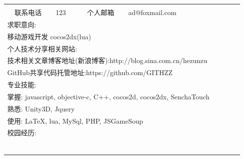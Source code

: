 \documentclass[11pt] {article}
\begin{document}
\begin{table}[!htbp]
\begin{tabular}{|c|l|c|l|c|l|c|l|c|}
		&&&&\\
		\cline{1-4}
		\multirow{2}{*}{联系电话} & \multirow{2}{*}{123} &\multirow{2}{*}{个人邮箱}&\multirow{2}{*}{ad@foxmail.com} &\\
		&&&&\\
		\hline
		\multicolumn{5}{|l|}{\multirow{2}{*}{求职意向:}}\\\multicolumn{5}{|c|}{}\\	
		\hline
		\multicolumn{5}{|l|}{\multirow{2}{*}{移动游戏开发 cocos2dx(lua)}}\\\multicolumn{5}{|c|}{}\\	
		\hline
		\multicolumn{5}{|l|}{\multirow{2}{*}{个人技术分享相关网站:}}\\\multicolumn{5}{|c|}{}\\	
		\hline
		\multicolumn{5}{|l|}{\multirow{2}{*}{技术相关文章博客地址(新浪博客):http://blog.sina.com.cn/hezunzu}}\\\multicolumn{5}{|c|}{}\\	
		\multicolumn{5}{|l|}{\multirow{2}{*}{GitHub共享代码托管地址:https://github.com/GITHZZ}}\\\multicolumn{5}{|c|}{}\\
		\hline
		\multicolumn{5}{|l|}{\multirow{2}{*}{专业技能:}}\\\multicolumn{5}{|c|}{}\\	
		\hline
		\multicolumn{5}{|l|}{\multirow{2}{*}{掌握:	javascript,	objective-c,	C++,		cocos2d,	cocos2dx,	SenchaTouch}}\\\multicolumn{5}{|c|}{}\\
		\multicolumn{5}{|l|}{\multirow{2}{*}{熟悉:	Unity3D,	Jquery}}\\\multicolumn{5}{|c|}{}\\
		\multicolumn{5}{|l|}{\multirow{2}{*}{使用:	LaTeX,	lua,	MySql,	PHP,		JSGameSoup}}\\\multicolumn{5}{|c|}{}\\
		\hline
		\multicolumn{5}{|l|}{\multirow{2}{*}{校园经历:}}\\\multicolumn{5}{|c|}{}\\	
		\hline
		\multicolumn{5}{|l|}{\multirow{2}{*}{}}\\\multicolumn{5}{|c|}{}\\	
		\multicolumn{5}{|l|}{\multirow{2}{*}{}}\\\multicolumn{5}{|c|}{}\\	
		\multicolumn{5}{|l|}{\multirow{2}{*}{}}\\\multicolumn{5}{|c|}{}\\	

\end{tabular}
\end{table}
\end{document}
